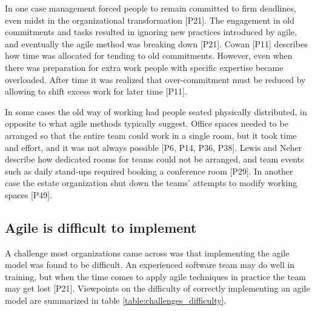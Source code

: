 In one case management forced people to remain committed to firm deadlines, even
midst in the organizational transformation [P21]. The engagement in old
commitments and tasks resulted in ignoring new practices introduced by agile,
and eventually the agile method was breaking down [P21].
Cowan [P11] describes how time was allocated for tending to old commitments.
However, even when there was preparation for extra work people with specific
expertise became overloaded. After time it was realized that over-commitment must
be reduced by allowing to shift excess work for later time [P11].



In some cases the old way of working had people seated physically distributed,
in opposite to what agile methods typically suggest. Office spaces needed to be
arranged so that the entire team could work in a single room, but it took time
and effort, and it was not always possible [P6, P14, P36, P38]. Lewis and Neher
describe how dedicated rooms for teams could not be arranged, and team events
such as daily stand-ups required booking a conference room [P29]. In another
case the estate organization shut down the teams' attempts to modify working
spaces [P49].


\subsection{Agile is difficult to implement}
\label{section_difficult_to_implement}

A challenge most organizations came across was that implementing the agile model
was found to be difficult. An experienced software team may do well in training,
but when the time comes to apply agile techniques in practice the team may get
lost [P21]. Viewpoints on the difficulty of correctly implementing an agile
model are summarized in table \ref{table:challenges_difficulty}.


